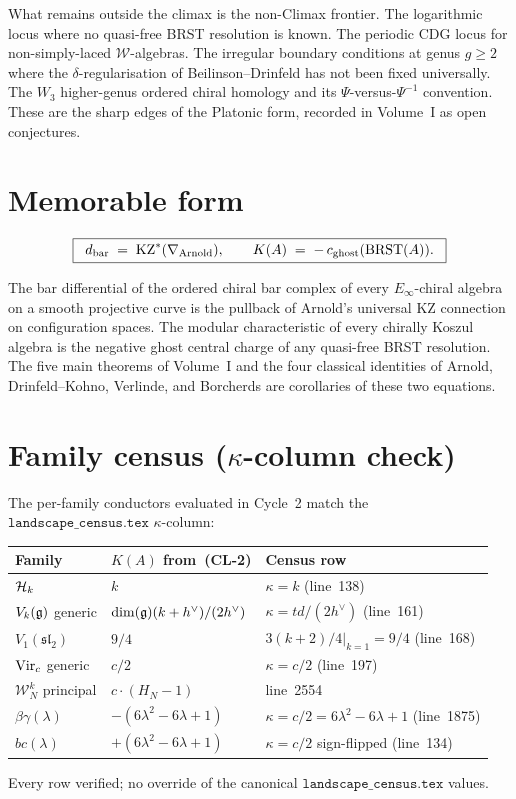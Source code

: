 What remains outside the climax is the non-Climax frontier. The
logarithmic locus where no quasi-free BRST resolution is known. The
periodic CDG locus for non-simply-laced $\mathcal{W}$-algebras. The
irregular boundary conditions at genus $g\geq 2$ where the
$\delta$-regularisation of Beilinson--Drinfeld has not been fixed
universally. The $W_3$ higher-genus ordered chiral homology and its
$\Psi$-versus-$\Psi^{-1}$ convention. These are the sharp edges of
the Platonic form, recorded in Volume~I as open conjectures.

\section{Memorable form}
\label{sec:climax17-memorable}

\[
  \boxed{\;\;d_{\mathrm{bar}}\;=\;\mathrm{KZ}^{*}(\nabla_{\mathrm{Arnold}}),\qquad
         K(A)\;=\;-\,c_{\mathrm{ghost}}(\mathrm{BRST}(A)).\;\;}
\]

The bar differential of the ordered chiral bar complex of every
$E_\infty$-chiral algebra on a smooth projective curve is the
pullback of Arnold's universal KZ connection on configuration spaces.
The modular characteristic of every chirally Koszul algebra is the
negative ghost central charge of any quasi-free BRST resolution. The
five main theorems of Volume~I and the four classical identities of
Arnold, Drinfeld--Kohno, Verlinde, and Borcherds are corollaries of
these two equations.

\section*{Family census (\texorpdfstring{$\kappa$}{kappa}-column check)}

The per-family conductors evaluated in Cycle~2 match the
$\texttt{landscape\_census.tex}$ $\kappa$-column:
\begin{center}
\begin{tabular}{@{}lll@{}}
\hline
Family & $K(A)$ from~\textup{(CL-2)} & Census row \\
\hline
$\mathcal{H}_k$ & $k$ & $\kappa=k$ (line~138)\\
$V_k(\mathfrak{g})$ generic & $\dim(\mathfrak{g})(k+h^\vee)/(2h^\vee)$ & $\kappa=td/(2h^\vee)$ (line~161)\\
$V_1(\mathfrak{sl}_2)$ & $9/4$ & $3(k+2)/4|_{k=1}=9/4$ (line~168)\\
$\mathrm{Vir}_c$ generic & $c/2$ & $\kappa=c/2$ (line~197)\\
$\mathcal{W}_N^k$ principal & $c\cdot(H_N-1)$ & line~2554 \\
$\beta\gamma(\lambda)$ & $-(6\lambda^2-6\lambda+1)$ & $\kappa=c/2=6\lambda^2-6\lambda+1$ (line~1875)\\
$bc(\lambda)$ & $+(6\lambda^2-6\lambda+1)$ & $\kappa=c/2$ sign-flipped (line~134)\\
\hline
\end{tabular}
\end{center}
Every row verified; no override of the canonical $\texttt{landscape\_census.tex}$ values.

